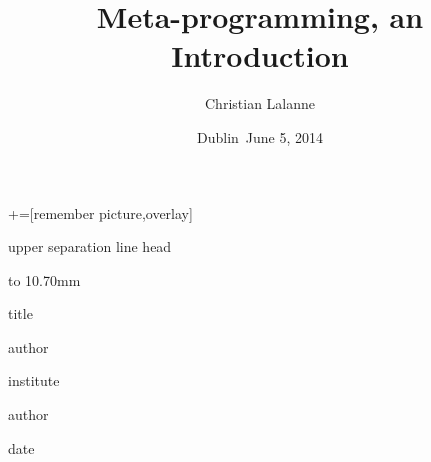 \documentclass[notes=hide,xcolor=svgnames,professionalfonts,lualatex]{beamer}
\title[Metaprogramming, an Introduction]
{Meta-programming, an Introduction}
\author[Christian Lalanne \emph{et. al}] %
{\textcolor{CherryRed}{Christian Lalanne}}
\institute[ICHEC] %
{
     \emph{Irish Centre for High-End Computing}    
}
\date[June 5, 2014] %
{Dublin\ June 5, 2014}
\begin{document}
+=[remember picture,overlay]

\everymath{\displaystyle}
\begin{frame}[plain]
 \begin{beamercolorbox}[wd=1.0\paperwidth,colsep=2.5pt]{upper separation line head}
 \end{beamercolorbox}    
\begin{beamercolorbox}[wd=1.0\paperwidth,colsep=2.5pt]{}
\vbox to 10.70mm {%
 \vfill {\hskip0mm } \vfil%
}%
\hskip-1.75mm
\end{beamercolorbox}

\begin{center}
\begin{beamercolorbox}[wd=1.0\paperwidth,center,ht=13.0mm]{title}
  \begin{minipage}{0.65\paperwidth}
   \begin{center}
    \inserttitle
    \end{center}
  \end{minipage}
\end{beamercolorbox}

\begin{beamercolorbox}[wd=\paperwidth,center,ht=11mm]{author}
   \insertauthor
\end{beamercolorbox}

\begin{beamercolorbox}[wd=\paperwidth,center,ht=7mm]{institute}
    \insertinstitute
\end{beamercolorbox}

\begin{beamercolorbox}[wd=\paperwidth,center,ht=9mm]{author}
\end{beamercolorbox}

\begin{beamercolorbox}[wd=\paperwidth,center,ht=13mm]{date}
  \insertdate
\end{beamercolorbox}

\end{center}
\addtocounter{framenumber}{-1}
\end{frame}
\end{document}
